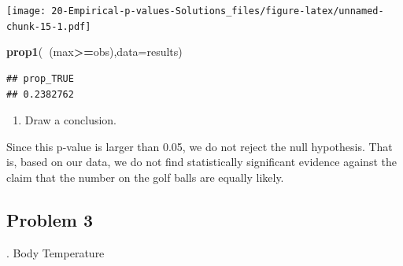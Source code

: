 \documentclass[
]{book}
\newenvironment{Shaded}{\begin{snugshade}}{\end{snugshade}}
\newcommand{\DataTypeTok}[1]{\textcolor[rgb]{0.13,0.29,0.53}{#1}}
\newcommand{\KeywordTok}[1]{\textcolor[rgb]{0.13,0.29,0.53}{\textbf{#1}}}
\newcommand{\NormalTok}[1]{#1}
\newcommand{\OperatorTok}[1]{\textcolor[rgb]{0.81,0.36,0.00}{\textbf{#1}}}
\newcommand{\StringTok}[1]{\textcolor[rgb]{0.31,0.60,0.02}{#1}}
\providecommand{\tightlist}{%
  \setlength{\itemsep}{0pt}\setlength{\parskip}{0pt}}
\begin{document}
\begin{Shaded}
\end{Shaded}

\texttt{[image: 20-Empirical-p-values-Solutions\_files/figure-latex/unnamed-chunk-15-1.pdf]}

\begin{Shaded}
\begin{Highlighting}[]
\KeywordTok{prop1}\NormalTok{(}\OperatorTok{~}\NormalTok{(max}\OperatorTok{>=}\NormalTok{obs),}\DataTypeTok{data=}\NormalTok{results)}
\end{Highlighting}
\end{Shaded}

\begin{verbatim}
## prop_TRUE 
## 0.2382762
\end{verbatim}

\begin{enumerate}
\def\labelenumi{\alph{enumi}.}
\setcounter{enumi}{3}
\tightlist
\item
  Draw a conclusion.
\end{enumerate}

Since this p-value is larger than 0.05, we do not reject the null hypothesis. That is, based on our data, we do not find statistically significant evidence against the claim that the number on the golf balls are equally likely.

\hypertarget{problem-3-13}{%
\subsection{Problem 3}\label{problem-3-13}}

. Body Temperature
\end{document}

